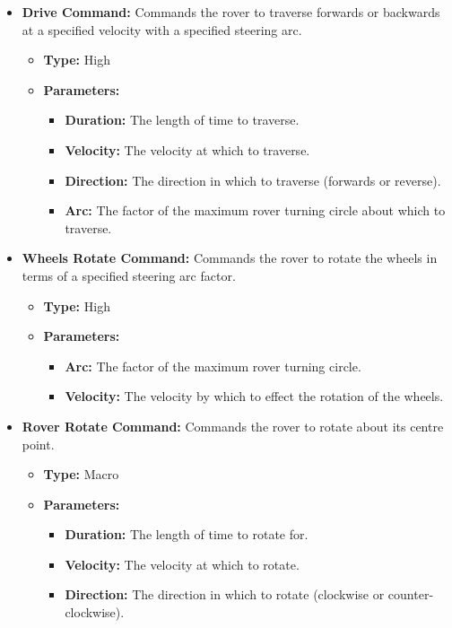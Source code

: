 \begin{itemize}
          \item \textbf{Drive Command:} Commands the rover to traverse forwards or backwards at a specified velocity with a specified steering arc.
          \begin{itemize}
            \item \textbf{Type:} High
            \item \textbf{Parameters:}
            \begin{itemize}
              \item \textbf{Duration:} The length of time to traverse.
              \item \textbf{Velocity:} The velocity at which to traverse.
              \item \textbf{Direction:} The direction in which to traverse (forwards or reverse).
              \item \textbf{Arc:} The factor of the maximum rover turning circle about which to traverse.
            \end{itemize}
          \end{itemize}
          
          \item \textbf{Wheels Rotate Command:} Commands the rover to rotate the wheels in terms of a specified steering arc factor.
          \begin{itemize}
            \item \textbf{Type:} High
            \item \textbf{Parameters:}
            \begin{itemize}
              \item \textbf{Arc:} The factor of the maximum rover turning circle.
              \item \textbf{Velocity:} The velocity by which to effect the rotation of the wheels.
            \end{itemize}
          \end{itemize}
          
          \item \textbf{Rover Rotate Command:} Commands the rover to rotate about its centre point.
          \begin{itemize}
            \item \textbf{Type:} Macro
            \item \textbf{Parameters:}
            \begin{itemize}
              \item \textbf{Duration:} The length of time to rotate for.
              \item \textbf{Velocity:} The velocity at which to rotate.
              \item \textbf{Direction:} The direction in which to rotate (clockwise or counter-clockwise).
            \end{itemize}
          \end{itemize}
          

\end{itemize}

